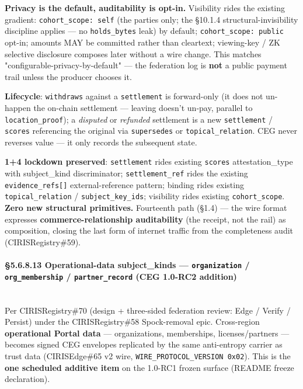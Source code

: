 \documentclass[10pt]{article}
\begin{document}
\textbf{Privacy is the default, auditability is opt-in.} Visibility rides the existing gradient: \texttt{cohort\_scope: self} (the parties only; the §10.1.4 structural-invisibility discipline applies — no \texttt{holds\_bytes} leak) by default; \texttt{cohort\_scope: public} opt-in; amounts MAY be committed rather than cleartext; viewing-key / ZK selective disclosure composes later without a wire change. This matches "configurable-privacy-by-default" — the federation log is \textbf{not} a public payment trail unless the producer chooses it.


\textbf{Lifecycle}: \texttt{withdraws} against a \texttt{settlement} is forward-only (it does not un-happen the on-chain settlement — leaving doesn't un-pay, parallel to \texttt{location\_proof}); a \textit{disputed} or \textit{refunded} settlement is a new \texttt{settlement} / \texttt{scores} referencing the original via \texttt{supersedes} or \texttt{topical\_relation}. CEG never reverses value — it only records the subsequent state.


\textbf{1+4 lockdown preserved}: \texttt{settlement} rides existing \texttt{scores} attestation\_type with subject\_kind discriminator; \texttt{settlement\_ref} rides the existing \texttt{evidence\_refs[]} external-reference pattern; binding rides existing \texttt{topical\_relation} / \texttt{subject\_key\_ids}; visibility rides existing \texttt{cohort\_scope}. \textbf{Zero new structural primitives.} Fourteenth path (§1.4) — the wire format expresses \textbf{commerce-relationship auditability} (the receipt, not the rail) as composition, closing the last form of internet traffic from the completeness audit (CIRISRegistry\#59).


\paragraph{§5.6.8.13 Operational-data subject\_kinds — \texttt{organization} / \texttt{org\_membership} / \texttt{partner\_record} (CEG 1.0-RC2 addition)}\mbox{}\\


Per CIRISRegistry\#70 (design + three-sided federation review: Edge / Verify / Persist) under the CIRISRegistry\#58 Spock-removal epic. Cross-region \textbf{operational Portal data} — organizations, memberships, licenses/partners — becomes signed CEG envelopes replicated by the same anti-entropy carrier as trust data (CIRISEdge\#65 v2 wire, \texttt{WIRE\_PROTOCOL\_VERSION 0x02}). This is the \textbf{one scheduled additive item} on the 1.0-RC1 frozen surface (README freeze declaration).
\end{document}
